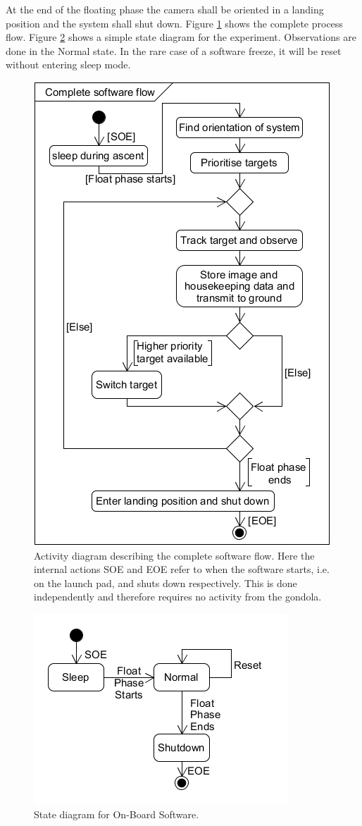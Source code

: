 At the end of the floating phase the camera shall be oriented in a landing position and the system shall shut down. Figure \ref{fig:software-activity-diagram} shows the complete process flow. Figure \ref{fig:software-state-diagram} shows a simple state diagram for the experiment. Observations are done in the Normal state. In the rare case of a software freeze, it will be reset without entering sleep mode.

\begin{figure}[H]
    \centering
    \includegraphics[width=.5\textwidth]{4-experiment-design/img/software/activity-diagram.png}
    \caption{Activity diagram describing the complete software flow. Here the internal actions SOE and EOE refer to when the software starts, i.e. on the launch pad, and shuts down respectively. This is done independently and therefore requires no activity from the gondola.}
    \label{fig:software-activity-diagram}
\end{figure}

\begin{figure}[H]
	\centering
	\includegraphics[width=.5\textwidth]{4-experiment-design/img/software/state-diagram.png}
	\caption{State diagram for On-Board Software.}
	\label{fig:software-state-diagram}
\end{figure}

